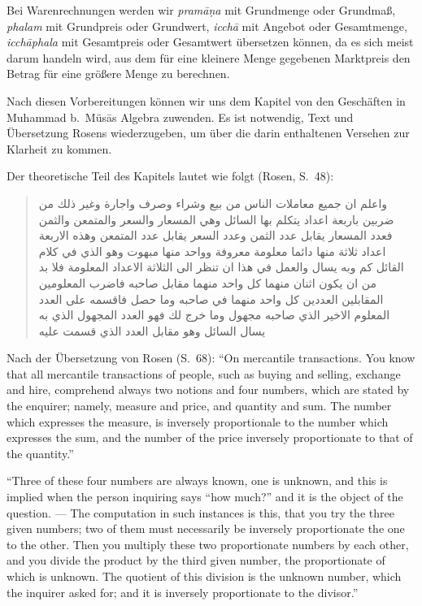 \documentclass[11pt,a4paper]{article}
\newcommand{\RL}[1]{\beginR#1\endR}
\newcommand{\ar}[1]{{\arabicfont\RL{#1}}}
\newcommand{\enquote}[1]{``#1''}
\begin{document}
Bei Warenrechnungen werden wir \textit{pram\=a\d{n}a} mit Grundmenge oder Grundma\ss{}, \textit{phalam} mit Grundpreis oder Grundwert, \textit{icch\=a} mit Angebot oder Gesamtmenge, \textit{icch\=aphala} mit Gesamtpreis oder Gesamtwert \"ubersetzen k\"onnen, da es sich meist darum handeln wird, aus dem f\"ur eine kleinere Menge gegebenen Marktpreis den Betrag f\"ur eine gr\"o\ss{}ere Menge zu berechnen.

Nach diesen Vorbereitungen k\"onnen wir uns dem Kapitel von den Gesch\"aften in Muhammad b.\ M\"us\=as Algebra zuwenden. Es ist notwendig, Text und \"Ubersetzung Rosens wiederzugeben, um \"uber die darin enthaltenen Versehen zur Klarheit zu kommen.

Der theoretische Teil des Kapitels lautet wie folgt (Rosen, S.\ 48):

\begin{quote}
\ar{واعلم ان جميع معاملات الناس من بيع وشراء وصرف واجارة وغير ذلك من ضربين باربعة اعداد يتكلم بها السائل وهي المسعار والسعر والمتمعن والثمن فعدد المسعار يقابل عدد الثمن وعدد السعر يقابل عدد المتمعن وهذه الاربعة اعداد ثلاثة منها دائما معلومة معروفة وواحد منها مبهوت وهو الذي في كلام القائل كم وبه يسال والعمل في هذا ان تنظر الى الثلاثة الاعداد المعلومة فلا بد من ان يكون اثنان منهما كل واحد منهما مقابل صاحبه فاضرب المعلومين المقابلين العددين كل واحد منهما في صاحبه وما حصل فاقسمه على العدد المعلوم الاخير الذي صاحبه مجهول وما خرج لك فهو العدد المجهول الذي به يسال السائل وهو مقابل العدد الذي قسمت عليه}
\end{quote}

Nach der \"Ubersetzung von Rosen (S.\ 68): \enquote{On mercantile transactions. You know that all mercantile transactions of people, such as buying and selling, exchange and hire, comprehend always two notions and four numbers, which are stated by the enquirer; namely, measure and price, and quantity and sum. The number which expresses the measure, is inversely proportionale to the number which expresses the sum, and the number of the price inversely proportionate to that of the quantity.}

\enquote{Three of these four numbers are always known, one is unknown, and this is implied when the person inquiring says \enquote{how much?} and it is the object of the question. --- The computation in such instances is this, that you try the three given numbers; two of them must necessarily be inversely proportionate the one to the other. Then you multiply these two proportionate numbers by each other, and you divide the product by the third given number, the proportionate of which is unknown. The quotient of this division is the unknown number, which the inquirer asked for; and it is inversely proportionate to the divisor.}
\end{document}
